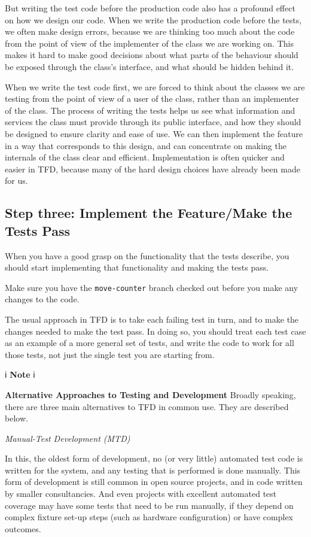 \documentclass[
]{book}
\begin{document}
But writing the test code before the production code also has a profound effect on how we design our code. When we write the production code before the tests, we often make design errors, because we are thinking too much about the code from the point of view of the implementer of the class we are working on. This makes it hard to make good decisions about what parts of the behaviour should be exposed through the class's interface, and what should be hidden behind it.

When we write the test code first, we are forced to think about the classes we are testing from the point of view of a user of the class, rather than an implementer of the class. The process of writing the tests helps us see what information and services the class must provide through its public interface, and how they should be designed to ensure clarity and ease of use. We can then implement the feature in a way that corresponds to this design, and can concentrate on making the internals of the class clear and efficient. Implementation is often quicker and easier in TFD, because many of the hard design choices have already been made for us.

\hypertarget{testsipass}{%
\subsection{Step three: Implement the Feature/Make the Tests Pass}\label{testsipass}}

When you have a good grasp on the functionality that the tests describe, you should start implementing that functionality and making the tests pass.

Make sure you have the \texttt{move-counter} branch checked out before you make any changes to the code.

The usual approach in TFD is to take each failing test in turn, and to make the changes needed to make the test pass. In doing so, you should treat each test case as an example of a more general set of tests, and write the code to work for all those tests, not just the single test you are starting from.

ℹ️ \textbf{Note} ℹ️

\textbf{Alternative Approaches to Testing and Development}
Broadly speaking, there are three main alternatives to TFD in common use. They are described below.

\emph{Manual-Test Development (MTD)}

In this, the oldest form of development, no (or very little) automated test code is written for the system, and any testing that is performed is done manually. This form of development is still common in open source projects, and in code written by smaller consultancies. And even projects with excellent automated test coverage may have some tests that need to be run manually, if they depend on complex fixture set-up steps (such as hardware configuration) or have complex outcomes.
\end{document}
